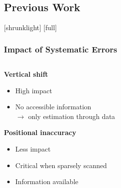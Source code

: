 \subsection{Previous Work}
[shrunklight]
[full]
\begin{frame}[t]
\frametitle{Impact of Systematic Errors}
\begin{columns}[t]
	\begin{column}{0.5\textwidth}
	\textbf{Vertical shift}
		\begin{itemize}
		\item High impact
		\item No accessible information \\
				$\rightarrow$ only estimation through data
		\end{itemize}
	\textbf{Positional inaccuracy}
		\begin{itemize}
		\item Less impact
		\item Critical when sparsely scanned
		\item Information available
		\end{itemize}
	\end{column}
	

\end{columns}
\end{frame}

